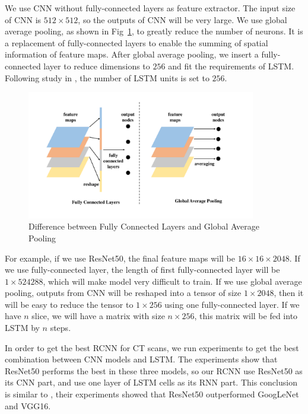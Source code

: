 \documentclass[journal]{IEEEtran}
\begin{document}
We use CNN without fully-connected layers as feature extractor. The input size of CNN is $512 \times 512$, so the outputs of CNN will be very large. We use global average pooling\cite{lin2014network}, as shown in Fig~\ref{gap}, to greatly reduce the number of neurons. It is a replacement of fully-connected layers to enable the summing of spatial information of feature maps. After global average pooling, we insert a fully-connected layer to reduce dimensions to $256$ and fit the requirements of LSTM. Following study in \cite{Donahue2015Long}, the number of LSTM units is set to $256$.
\begin{figure}[htb]
    \centerline{\includegraphics[width=100mm]{gap.pdf}}
    \vspace{-0cm}
    \caption{Difference between Fully Connected Layers and Global Average Pooling}
    \vspace{-0cm}
    \label{gap}
    \end{figure}

For example, if we use ResNet50, the final feature maps will be $16 \times 16 \times 2048$. If we use fully-connected layer, the length of first fully-connected layer will be $1 \times 524288$, which will make model very difficult to train. 
If we use global average pooling, outputs from CNN will be reshaped into a tensor of size $1 \times 2048$, then it will be easy to reduce the tensor to $1 \times 256$ using one fully-connected layer. If we have $n$ slice, we will have a matrix with size $n \times 256$, this matrix will be fed into LSTM by $n$ steps.

In order to get the best RCNN for CT scans, we run experiments to get the best combination between CNN models and LSTM. The experiments show that ResNet50 performs the best in these three models, so our RCNN use ResNet50 as its CNN part, and use one layer of LSTM cells as its RNN part. This conclusion is similar to \cite{Wang2017ChestX}, their experiments showed that ResNet50 outperformed GoogLeNet and VGG16.
\end{document}
